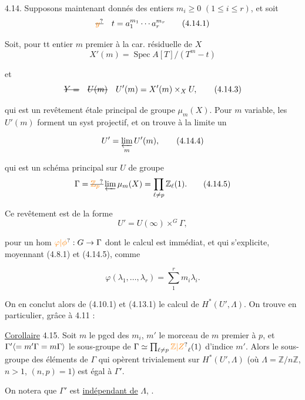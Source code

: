 4.14.   Supposons maintenant donnés des entiers $m_i\geq0$ $(1\leq i\leq r)$, et  soit
\[
\deleted{\unsure{y}}\quad t=a_1^{m_1}\cdots a_r^{m_r}
\tag*{(4.14.1)}
\]

Soit, pour tt entier $m$ premier à la car. résiduelle de $X$
\[
X'(m)=\operatorname{Spec}A[T]/(T^m-t)
\tag*{(4.14.2)}
\]

et 
\[
\deleted{Y=}\quad\deleted{U(m)}\quad U'(m)=X'(m)\times_X U,
\tag*{(4.14.3)}
\]

qui est un revêtement étale principal  de groupe $\mu_m(X)$. Pour $m$ variable, les  $U'(m)$ forment un syst projectif, et on trouve à la limite un

\[
U'=\varprojlim_m U'(m),
\tag*{(4.14.4)}
\]

qui est un schéma principal sur $U$ de groupe
\[
\Gamma=\deleted{\unsure{\mathbb{Z}_p}}\varprojlim\mu_m(X)=\prod_{\ell\ne p}\mathbb{Z}_\ell(1).
\tag*{(4.14.5)}
\]


Ce revêtement est de la forme
\[
U'=U(\infty)\mathbin{\times^G}\Gamma,
\tag*{(}
\]

pour un hom $\unsure{\varphi|\phi}:G\to\Gamma$ dont le calcul est immédiat, et qui  s'explicite, moyennant (4.8.1) et (4.14.5), comme

\[
\varphi(\lambda_1,\ldots,\lambda_r)=\sum_1^r m_i\lambda_i.
\tag*{(4.14.6)}
\]

On en conclut alors de (4.10.1) et (4.13.1) le calcul de $H^*(U',\Lambda)$. On trouve en particulier, grâce à 4.11 :

\uline{Corollaire} 4.15.  Soit $m$ le pgcd des $m_i$,   $m'$ le morceau de $m$ premier à $p$, et $\Gamma'\inserted{=m'\Gamma=m\Gamma}$ le sous-groupe de $\Gamma\simeq\prod_{\ell\ne p}\unsure{\mathbb{Z}|Z}_\ell(1)$ d'indice $m'$. Alors le sous-groupe des éléments de $\Gamma$ qui opèrent trivialement sur $H^*(U',\Lambda)$ (où $\Lambda=\mathbb{Z}/n\mathbb{Z}$, $n>1$, $(n,p)=1$) est égal à $\Gamma'$. 

On notera que $\Gamma'$ est \uline{indépendant de} $\Lambda$, .


